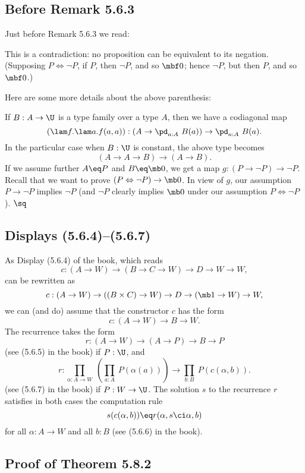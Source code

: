 \documentclass[12pt]{article}
\begin{document}

\subsection{Before Remark 5.6.3}%

Just before Remark 5.6.3 we read:

\nn\guillemotleft This is a contradiction: no proposition can be equivalent to its negation. (Supposing $P\Leftrightarrow\neg P$, if $P$, then $\neg P$, and so $\mbf0$; hence $\neg P$, but then $P$, and so $\mbf0$.)\guillemotright

Here are some more details about the above parenthesis:

If $B:A\to\U$ is a type family over a type $A$, then we have a codiagonal map 
\begin{equation}\label{563}
(\lam f.\lam a.f(a,a)):\left(A\to\pd_{a:A}\ B(a)\right)\to\pd_{a:A}\ B(a).
\end{equation} 
In the particular case when $B:\U$ is constant, the above type becomes 
$$
(A\to A\to B)\to(A\to B).
$$ 
If we assume further $A\eq P$ and $B\eq\mb0$, we get a map $g:(P\to\neg P)\to\neg P$. Recall that we want to prove $(P\Leftrightarrow\neg P)\to\mb0$. In view of $g$, our assumption $P\to\neg P$ implies $\neg P$ (and $\neg P$ clearly implies $\mb0$ under our assumption $P\Leftrightarrow\neg P$). $\sq$


\subsection{Displays (5.6.4)--(5.6.7)}%

As Display (5.6.4) of the book, which reads 
$$
c:(A\to W)\to(B\to C\to W)\to D\to W\to W,
$$ 
can be rewritten as 
$$
c:(A\to W)\to((B\times C)\to W)\to D\to(\mb1\to W)\to W,
$$ 
we can (and do) assume that the constructor $c$ has the form 
$$
c:(A\to W)\to B\to W.
$$ 
The recurrence takes the form 
$$
r:(A\to W)\to(A\to P)\to B\to P
$$ 
(see (5.6.5) in the book) if $P:\U$, and 
$$
r:\prod_{\alpha:A\to W}\ \left(\prod_{a:A}\ P(\alpha(a))\right)\to\prod_{b:B}\ P(c(\alpha,b)).
$$ 
(see (5.6.7) in the book) if $P:W\to\U$. The solution $s$ to the recurrence $r$ satisfies in both cases the computation rule
$$
s(c(\alpha,b))\eq r(\alpha,s\ci\alpha,b)
$$ 
for all $\alpha:A\to W$ and all $b:B$ (see (5.6.6) in the book).


\subsection{Proof of Theorem 5.8.2}\label{582}
\end{document}
